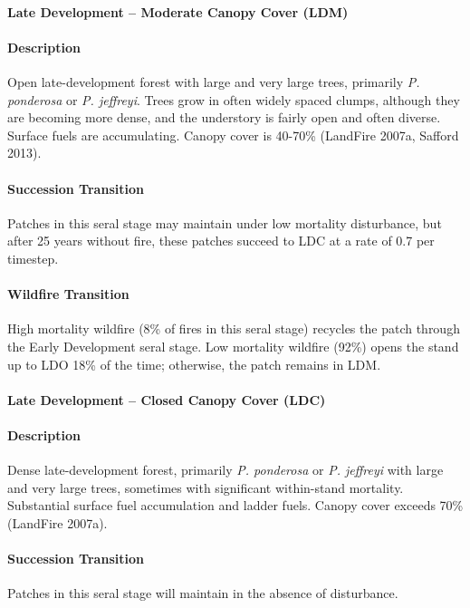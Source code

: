 \paragraph{Late Development – Moderate Canopy Cover (LDM)}

\paragraph{Description} Open late-development forest with large and very large trees, primarily \emph{P. ponderosa} or \emph{P. jeffreyi}. Trees grow in often widely spaced clumps, although they are becoming more dense, and the understory is fairly open and often diverse. Surface fuels are accumulating. Canopy cover is 40-70\% (LandFire 2007a, Safford 2013).

\paragraph{Succession Transition} Patches in this seral stage may maintain under low mortality disturbance, but after 25 years without fire, these patches succeed to LDC at a rate of 0.7 per timestep.

\paragraph{Wildfire Transition} High mortality wildfire (8\% of fires in this seral stage) recycles the patch through the Early Development seral stage. Low mortality wildfire (92\%) opens the stand up to LDO 18\% of the time; otherwise, the patch remains in LDM.

\noindent\hrulefill

\paragraph{Late Development – Closed Canopy Cover (LDC)}

\paragraph{Description} Dense late-development forest, primarily \emph{P. ponderosa} or \emph{P. jeffreyi} with large and very large trees, sometimes with significant within-stand mortality. Substantial surface fuel accumulation and ladder fuels. Canopy cover exceeds 70\% (LandFire 2007a).

\paragraph{Succession Transition} Patches in this seral stage will maintain in the absence of disturbance.

